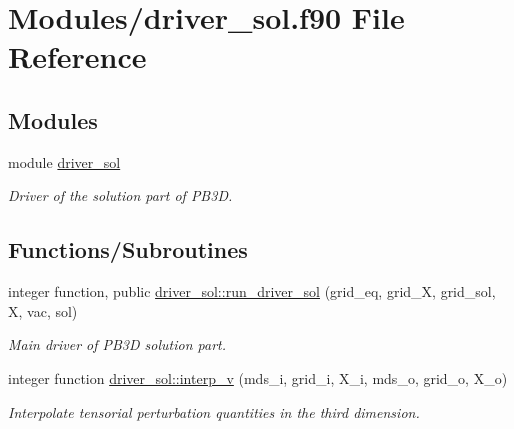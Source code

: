 \hypertarget{driver__sol_8f90}{}\section{Modules/driver\+\_\+sol.f90 File Reference}
\label{driver__sol_8f90}
\subsection*{Modules}
\begin{DoxyCompactItemize}
\item 
module \hyperlink{namespacedriver__sol}{driver\+\_\+sol}
\begin{DoxyCompactList}\small\item\em Driver of the solution part of P\+B3D. \end{DoxyCompactList}\end{DoxyCompactItemize}
\subsection*{Functions/\+Subroutines}
\begin{DoxyCompactItemize}
\item 
integer function, public \hyperlink{namespacedriver__sol_ad3b1765b3ecc5f82129bfc683ffc6c5c}{driver\+\_\+sol\+::run\+\_\+driver\+\_\+sol} (grid\+\_\+eq, grid\+\_\+X, grid\+\_\+sol, X, vac, sol)
\begin{DoxyCompactList}\small\item\em Main driver of P\+B3D solution part. \end{DoxyCompactList}\item 
integer function \hyperlink{namespacedriver__sol_af1c4ea0286ad714d3f91bb1608e4fc27}{driver\+\_\+sol\+::interp\+\_\+v} (mds\+\_\+i, grid\+\_\+i, X\+\_\+i, mds\+\_\+o, grid\+\_\+o, X\+\_\+o)
\begin{DoxyCompactList}\small\item\em Interpolate tensorial perturbation quantities in the third dimension. \end{DoxyCompactList}\end{DoxyCompactItemize}
